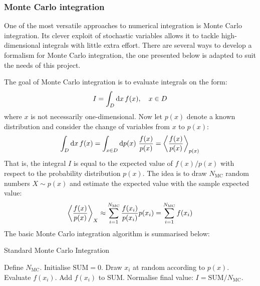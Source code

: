 \documentclass[nofootinbib,reprint,english]{revtex4-1}
\begin{document}
\subsubsection{Monte Carlo integration}
One of the most versatile approaches to numerical integration is Monte Carlo integration. Its clever exploit of stochastic variables allows it to tackle high-dimensional integrals with little extra effort. There are several ways to develop a formalism for Monte Carlo integration, the one presented below is adapted to suit the needs of this project.

The goal of Monte Carlo integration is to evaluate integrals on the form:
\begin{equation}\label{eq:general_integral}
I=\int_D\dd{x}f(x)\qc x\in D
\end{equation}
where \(x\) is not necessarily one-dimensional. Now let \(p(x)\) denote a known distribution and consider the change of variables from \(x\) to \(p(x)\):
\begin{equation}\label{eq:integral_to_expected_value}
\int_D\dd{x}f(x)=\int_{x\in D}\dd{p(x)}\,\frac{f(x)}{p(x)}=\expval{\frac{f(x)}{p(x)}}_{p(x)}
\end{equation}
That is, the integral \(I\) is equal to the expected value of \(f(x)/p(x)\) with respect to the probability distribution \(p(x)\). The idea is to draw \(N_\text{MC}\) random numbers \(X\sim p(x)\) and estimate the expected value with the sample expected value:
\begin{equation}\label{eq:approximated_expected_value}
\expval{\frac{f(x)}{p(x)}}_X\approx\sum_{i=1}^{N_\text{MC}}\frac{f(x_i)}{p(x_i)}p(x_i)=\sum_{i=1}^{N_\text{MC}}f(x_i)
\end{equation}
The basic Monte Carlo integration algorithm is summarised below:
\begin{algorithm}[H]
\caption{Standard Monte Carlo Integration}\label{algo:standard_Monte_Carlo}
\begin{algorithmic}[1]
\State Define \(N_\text{MC}\).
\State Initialise \(\text{SUM}=0\).
	\State Draw \(x_i\) at random according to \(p(x)\).
	\State Evaluate \(f(x_i)\).
	\State Add \(f(x_i)\) to SUM.
\EndFor
\State Normalise final value: \(I=\text{SUM}/N_\text{MC}\).
\end{algorithmic}
\end{algorithm}
\end{document}
